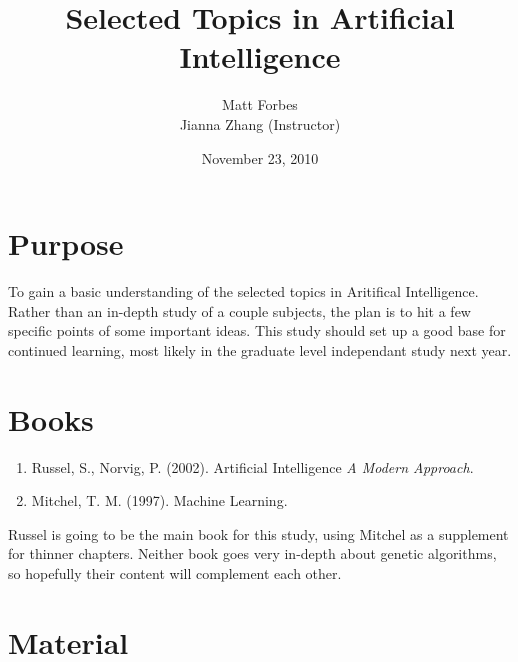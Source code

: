 \documentclass[a4paper,12pt]{article}
\begin{document}
\title{Selected Topics in Artificial Intelligence}
\author{Matt Forbes \\ Jianna Zhang (Instructor)}
\date{November 23, 2010}
\maketitle

\section*{Purpose}
To gain a basic understanding of the selected topics in Aritifical
Intelligence. Rather than an in-depth study of a couple subjects, the
plan is to hit a few specific points of some important ideas. This
study should set up a good base for continued learning, most likely in
the graduate level independant study next year.

\section*{Books}

\begin{enumerate}[1)]

\item Russel, S., Norvig, P. (2002). Artificial Intelligence {\it A Modern Approach}.
\item Mitchel, T. M. (1997). Machine Learning.
  
\end{enumerate}

Russel is going to be the main book for this study, using Mitchel as a
supplement for thinner chapters. Neither book goes very in-depth about
genetic algorithms, so hopefully their content will complement each other.

\section*{Material}
\end{document}
